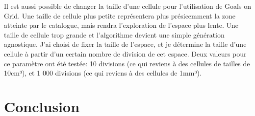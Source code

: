 \documentclass[11pt,french]{report}
\begin{document}
Il est aussi possible de changer la taille d'une cellule pour l'utilisation de Goals on Grid. Une taille de cellule plus petite représentera plus présicemment la zone atteinte par le catalogue, mais rendra l'exploration de l'espace plus lente. Une taille de cellule trop grande et l'algorithme devient une simple génération agnostique. J'ai choisi de fixer la taille de l'espace, et je détermine la taille d'une cellule à partir d'un certain nombre de division de cet espace. Deux valeurs pour ce paramètre ont été testée: 10 divisions (ce qui reviens à des cellules de tailles de 10cm³), et 1 000 divisions (ce qui reviens à des cellules de 1mm³).

\chapter{Conclusion}
\end{document}
